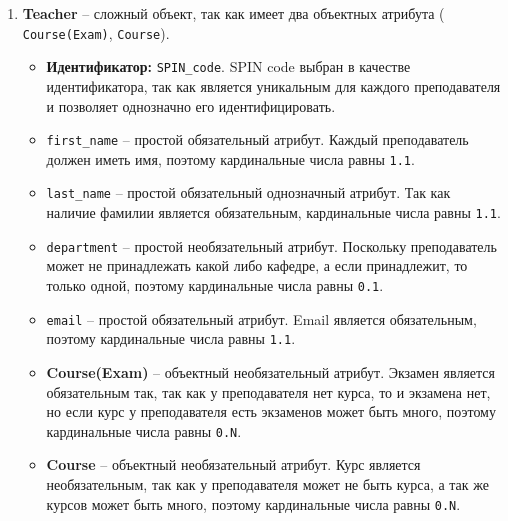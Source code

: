 \documentclass[a4paper, 14pt]{extarticle}
\begin{document}
\begin{enumerate}
    \item \textbf{Teacher} -- сложный объект, так как имеет два объектных атрибута (  \texttt{Course(Exam)}, \texttt{Course}).
    \begin{itemize}
        \item \textbf{Идентификатор:} \texttt{SPIN\_code}. SPIN code выбран в качестве идентификатора, так как является уникальным для каждого преподавателя и позволяет однозначно его идентифицировать.
        \item \texttt{first\_name} – простой обязательный атрибут. Каждый преподаватель должен иметь имя, поэтому кардинальные числа равны \texttt{1.1}.
        \item \texttt{last\_name} – простой обязательный однозначный атрибут. Так как наличие фамилии является обязательным, кардинальные числа равны \texttt{1.1}.
        \item \texttt{department} – простой необязательный атрибут. Поскольку преподаватель может не принадлежать какой либо кафедре, а если принадлежит, то только одной, поэтому кардинальные числа равны \texttt{0.1}.
        \item \texttt{email} – простой обязательный атрибут. Email является обязательным, поэтому кардинальные числа равны \texttt{1.1}.
        \item \textbf{Course(Exam)} – объектный необязательный атрибут. Экзамен является обязательным так, так как у преподавателя нет курса, то и экзамена нет, но если курс у преподавателя есть экзаменов может быть много, поэтому кардинальные числа равны \texttt{0.N}.
        \item \textbf{Course} – объектный необязательный атрибут. Курс является необязательным, так как у преподавателя может не быть курса, а так же курсов может быть много, поэтому кардинальные числа равны \texttt{0.N}.
    \end{itemize}


\end{enumerate}
\end{document}
